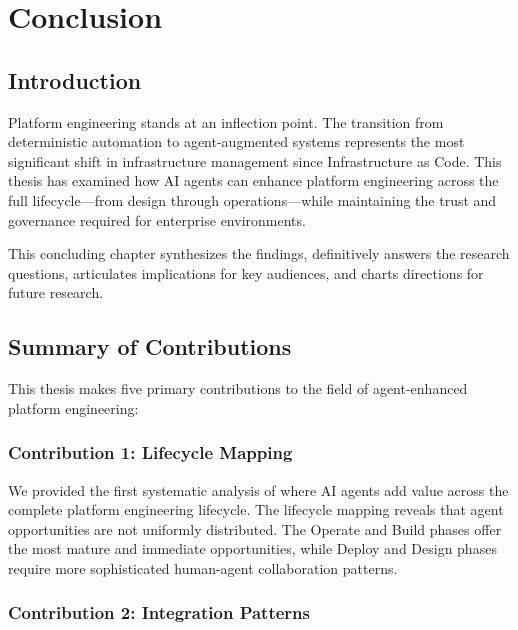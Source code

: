 \chapter{Conclusion}
\label{ch:conclusion}


\section{Introduction}
\label{sec:conclusion-intro}

Platform engineering stands at an inflection point. The transition from deterministic automation to agent-augmented systems represents the most significant shift in infrastructure management since Infrastructure as Code. This thesis has examined how AI agents can enhance platform engineering across the full lifecycle---from design through operations---while maintaining the trust and governance required for enterprise environments.

This concluding chapter synthesizes the findings, definitively answers the research questions, articulates implications for key audiences, and charts directions for future research.

\section{Summary of Contributions}
\label{sec:summary-contributions}

This thesis makes five primary contributions to the field of agent-enhanced platform engineering:

\subsection{Contribution 1: Lifecycle Mapping}
\label{subsec:lifecycle-mapping}

We provided the first systematic analysis of where AI agents add value across the complete platform engineering lifecycle. The lifecycle mapping reveals that agent opportunities are not uniformly distributed. The Operate and Build phases offer the most mature and immediate opportunities, while Deploy and Design phases require more sophisticated human-agent collaboration patterns.

\subsection{Contribution 2: Integration Patterns}
\label{subsec:integration-patterns}

